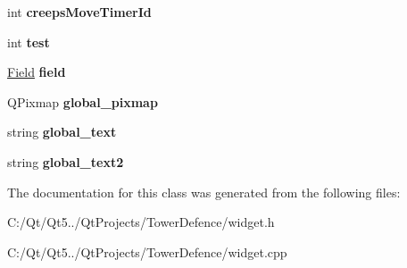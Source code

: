 \begin{DoxyCompactItemize}
\item 
\hypertarget{class_widget_ae9a86c4d8588dc4cfa2b1362bb9d32a6}{}int {\bfseries creeps\+Move\+Timer\+Id}\label{class_widget_ae9a86c4d8588dc4cfa2b1362bb9d32a6}

\item 
\hypertarget{class_widget_aed3a06b72d58168a57916191d858bfcb}{}int {\bfseries test}\label{class_widget_aed3a06b72d58168a57916191d858bfcb}

\item 
\hypertarget{class_widget_ab4d0c4bdde256166178f15f32b55279b}{}\hyperlink{class_field}{Field} {\bfseries field}\label{class_widget_ab4d0c4bdde256166178f15f32b55279b}

\item 
\hypertarget{class_widget_ac844093f3ae27846e7049abf65fd7439}{}Q\+Pixmap {\bfseries global\+\_\+pixmap}\label{class_widget_ac844093f3ae27846e7049abf65fd7439}

\item 
\hypertarget{class_widget_a05c160093966f89cf0a045927accd9d2}{}string {\bfseries global\+\_\+text}\label{class_widget_a05c160093966f89cf0a045927accd9d2}

\item 
\hypertarget{class_widget_a5d172f5d5e2208ae73d91dea4367d138}{}string {\bfseries global\+\_\+text2}\label{class_widget_a5d172f5d5e2208ae73d91dea4367d138}

\end{DoxyCompactItemize}


The documentation for this class was generated from the following files\+:\begin{DoxyCompactItemize}
\item 
C\+:/\+Qt/\+Qt5../\+Qt\+Projects/\+Tower\+Defence/widget.\+h\item 
C\+:/\+Qt/\+Qt5../\+Qt\+Projects/\+Tower\+Defence/widget.\+cpp\end{DoxyCompactItemize}
